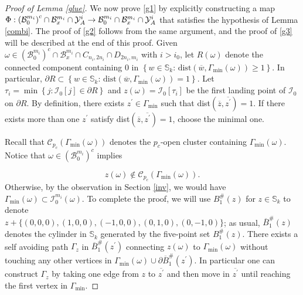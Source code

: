 \documentclass[12pt, twoside,a4paper,reqno]{amsart}
\theoremstyle{plain}
\theoremstyle{remark}
\theoremstyle{definition}
\renewcommand{\bar}{\overline}
\begin{document}
\begin{proof}[Proof of Lemma \ref{glue}]
We now prove \eqref{g1} by explicitly constructing a map $\Phi :\left(
\mathcal{B}_{0}^{m_{i}}\right) ^{c}\cap \mathcal{B}_{x}^{m_{i}}\cap \mathcal{%
Y}_{A}^{i}\rightarrow \mathcal{B}_{0}^{m_{i}}\cap \mathcal{B}%
_{x}^{m_{i}}\cap \mathcal{Y}_{A}^{i}$ that satisfies the hypothesis of Lemma %
\ref{combi}. The proof of \eqref{g2} follows from the same argument, and the proof of \eqref{g3} will be described at the end of this proof. Given $%
\omega \in \left( \mathcal{B}_{0}^{m_{i}}\right) ^{c}\cap \mathcal{B}%
_{x}^{m_{i}}\cap C_{n_{i},2n_{i}}\cap D_{2n_{i},m_{i}}$ with $i>i_{0}$, let $%
R\left( \omega \right) $ denote the connected component containing $0$ in $%
\left\{ w\in \mathbb{S}_{k}\text{: dist}\left( \bar{w},\Gamma _{\min }\left(
\omega \right) \right) \ge 1\right\} $. In particular, $\partial R \subset \left\{ w\in \mathbb{S}_{k}\text{: dist}\left( \bar{w},\Gamma _{\min }\left(
\omega \right) \right) =1\right\}$. Let $\tau _{i}=\min \left\{ j:\mathcal{I%
}_{0}\left[ j\right] \in \partial R\right\} $ and $z(\omega)=\mathcal{I}_{0}\left[
\tau _{i}\right] $ be the first landing point of $\mathcal{I}_{0}$ on $%
\partial R$. By definition, there exists $z^{\prime }\in \Gamma _{\min }$
such that dist$\left( \bar{z},\bar{z^{\prime }}\right) =1$. If there exists
more than one $z^{\prime }$ satisfy dist$\left( \bar{z},\bar{z^{\prime }}\right)
=1$, choose the minimal one.


Recall that $\mathcal{C}_{p_{c}}\left( \Gamma _{\min }\left( \omega \right)
\right) $ denotes the $p_{c}$-open cluster containing $\Gamma _{\min }\left(
\omega \right) $. Notice that $\omega \in \left( \mathcal{B}%
_{0}^{m_{i}}\right) ^{c}$ implies

\begin{equation}
z\left( \omega \right) \notin \mathcal{C}_{p_{c}}\left( \Gamma _{\min
}\left( \omega \right) \right) .  \label{f1}
\end{equation}%
Otherwise, by the observation in Section \ref{inv}, we would have $\Gamma _{\min }\left(
\omega \right) \subset \mathcal{I}_{0}^{m_{i}}\left( \omega \right) $.
To complete the proof, we will use $B_{1}^{\#}(z)$ for $ z\in \mathbb{S}_{k}$ to denote\\
$ z+\{(0,0,0),(1,0,0),(-1,0,0),(0,1,0),(0,-1,0)\}$; as usual, $\bar{B}_{1}^{\#}\left( z\right)$
denotes the cylinder in $\mathbb{S}_k$ generated by the five-point set $B_{1}^{\#}(z)$.
There exists a self avoiding path $\Gamma _{z}$ in $\bar{B}%
_{1}^{\#}\left( z^{\prime }\right) $ connecting $z\left( \omega \right) $ to $%
\Gamma _{\min }\left( \omega \right)$ without touching any other vertices
in $\Gamma _{\min }\left( \omega \right)
\cup \partial \bar{B}_{1}^{\#}\left( z^{\prime }\right) $. In particular one can construct $\Gamma _{z}$ by taking
one edge from $z$ to $\bar{z^{\prime }}$ and then move in $\bar{z^{\prime }}$ until reaching the first vertex in $\Gamma _{\min }$.


\end{proof}
\end{document}

